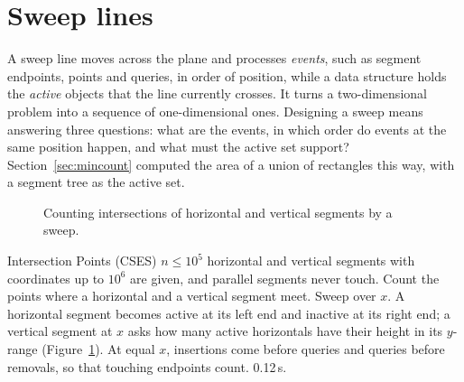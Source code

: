 \section[Sweep lines]{Sweep lines \hfill \plat}\label{sec:sweep}

A sweep line moves across the plane and processes \emph{events}, such as segment endpoints, points and queries, in order of position,
while a data structure holds the \emph{active} objects that the line currently crosses. It turns a two-dimensional problem into a
sequence of one-dimensional ones. Designing a sweep means answering three questions: what are the events, in which order do events at the
same position happen, and what must the active set support? Section~\ref{sec:mincount} computed the area of a union of rectangles this
way, with a segment tree as the active set.

\begin{figure}[htbp]
\centering
{}
\caption{Counting intersections of horizontal and vertical segments by a sweep.}
\label{fig:intpoints}
\end{figure}

\begin{problem}{Intersection Points (CSES)}
$n \le 10^5$ horizontal and vertical segments with coordinates up to $10^6$ are given, and parallel segments never touch. Count the
points where a horizontal and a vertical segment meet.
\solution Sweep over $x$. A horizontal segment becomes active at its left end and inactive at its right end; a vertical segment at $x$
asks how many active horizontals have their height in its $y$-range (Figure~\ref{fig:intpoints}). At equal $x$, insertions come before
queries and queries before removals, so that touching endpoints count. 0.12\,s.
\end{problem}

